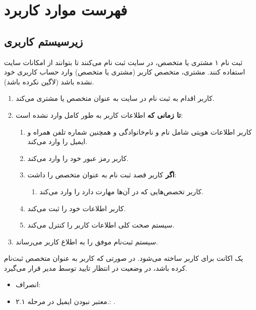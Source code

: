 \newpage
\section{فهرست موارد کاربرد}


\subsection{زیرسیستم کاربری}
\renewcommand{\labelenumiii}{\arabic{enumi}.\arabic{enumii}.\arabic{enumiii}}

{
\usecase
{ثبت نام}
{۱}
{مشتری یا متخصص، در سایت ثبت نام می‌کنند تا بتوانند از امکانات سایت استفاده کنند.}
{مشتری، متخصص}
{}{کاربر (مشتری یا متخصص) وارد حساب کاربری خود نشده باشد (لاگین نکرده باشد).}
{
\vspace*{-0.6cm}
\begin{enumerate}
	\item 
	کاربر اقدام به ثبت نام در سایت به عنوان متخصص یا مشتری می‌کند.
	\item
	\textbf{تا زمانی که} اطلاعات کاربر به طور کامل وارد نشده است:
	
	\begin{enumerate}[label=\theenumi.\arabic*.]
	\item
	کاربر اطلاعات هویتی شامل نام و نام‌خانوادگی و همچنین شماره تلفن همراه و ایمیل را وارد می‌کند.
	\item 
	کاربر رمز عبور خود را وارد می‌کند.
	
	\item 
	\textbf{اگر} کاربر قصد ثبت نام به عنوان متخصص را داشت:
	\begin{enumerate}
		\item 
		کاربر تخصص‌هایی که در آن‌ها مهارت دارد را وارد می‌کند.
	\end{enumerate}

	\item 
	کاربر اطلاعات خود را ثبت می‌کند.
	
	\item 
	سیستم صحت کلی اطلاعات کاربر را کنترل می‌کند.
	\end{enumerate}
	
	\item 
	سیستم ثبت‌نام موفق را به اطلاع کاربر می‌رساند.
	
	
\end{enumerate}
}
{یک اکانت برای کاربر ساخته می‌شود. در صورتی که کاربر به عنوان متخصص ثبت‌نام کرده باشد، در وضعیت در انتظار تایید توسط مدیر قرار می‌گیرد.}
{\begin{itemize}
		\vspace*{-0.6cm}
		\item انصراف: 
		\item معتبر نبودن ایمیل در مرحله ۲.۱.: .
		

\end{itemize}}}
